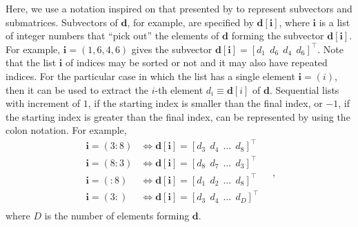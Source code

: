 Here, we use a notation inspired on that presented by \cite[][p. 4]{vanloan1992} to represent subvectors and submatrices.
Subvectors of $\mathbf{d}$, for example, are specified by $\mathbf{d}[\mathbf{i}]$, where $\mathbf{i}$ is a
list of integer numbers that ``pick out'' the elements of $\mathbf{d}$ forming the subvector $\mathbf{d}[\mathbf{i}]$.
For example, $\mathbf{i} = (1, 6, 4, 6)$ gives the subvector $\mathbf{d}[\mathbf{i}] = [ d_{1} \:\: d_{6} \:\: d_{4} \:\: d_{6} ]^{\top} $.
Note that the list $\mathbf{i}$ of indices may be sorted or not and it may also have repeated indices.
For the particular case in which the list has a single element $\mathbf{i} = (i)$, then it can be used to extract the $i$-th element 
$d_{i} \equiv \mathbf{d}[i]$ of $\mathbf{d}$.
Sequential lists with increment of $1$, if the starting index is smaller than the final index, or $-1$,
if the starting index is greater than the final index, can be represented by using the colon notation. For example, 
\begin{equation*}
	\begin{split}
		\mathbf{i} = (3:8) &\Leftrightarrow \mathbf{d}[\mathbf{i}] = [ d_{3} \:\: d_{4} \:\: \dots \:\: d_{8} ]^{\top} \\
		\mathbf{i} = (8:3) &\Leftrightarrow \mathbf{d}[\mathbf{i}] = [ d_{8} \:\: d_{7} \:\: \dots \:\: d_{3} ]^{\top} \\
		\mathbf{i} = (:8) &\Leftrightarrow \mathbf{d}[\mathbf{i}] = [ d_{1} \:\: d_{2} \:\: \dots \:\: d_{8} ]^{\top} \\
		\mathbf{i} = (3:) &\Leftrightarrow \mathbf{d}[\mathbf{i}] = [ d_{3} \:\: d_{4} \:\: \dots \:\: d_{D} ]^{\top} \\
	\end{split} \quad ,
\end{equation*}
where $D$ is the number of elements forming $\mathbf{d}$.

